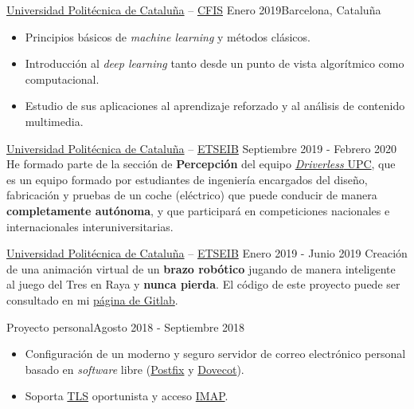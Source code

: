 \documentclass[10pt, a4paper, ragged2e]{../altacv}
\begin{document}
{\href{https://upc.edu}{Universidad Politécnica de Cataluña} --
  \href{https://cfis.upc.edu}{CFIS}}
{Enero 2019}{Barcelona, Cataluña}
\begin{itemize}
  \item Principios básicos de \textit{machine learning} y métodos clásicos.
  \item Introducción al \textit{deep learning} tanto desde un punto de vista
  algorítmico como computacional.
  \item Estudio de sus aplicaciones al aprendizaje reforzado y al análisis de
  contenido multimedia.
\end{itemize}


\clearpage


{\href{https://upc.edu}{Universidad Politécnica de Cataluña} --
\href{https://etseib.upc.edu}{ETSEIB}}
{Septiembre 2019 - Febrero 2020}{}
He formado parte de la sección de \textbf{Percepción} del equipo
\href{https://driverless.upc.edu}{\textit{Driverless} UPC}, que es un equipo
formado por estudiantes de ingeniería encargados del diseño, fabricación y
pruebas de un coche (eléctrico) que puede conducir de manera \textbf{completamente
autónoma}, y que participará en competiciones nacionales e internacionales
interuniversitarias.

\divider

{\href{https://upc.edu}{Universidad Politécnica de Cataluña} --
\href{https://etseib.upc.edu}{ETSEIB}}
{Enero 2019 - Junio 2019}{}
Creación de una animación virtual de un \textbf{brazo robótico} jugando de
manera inteligente al juego del Tres en Raya y \textbf{nunca pierda}. El código
de este proyecto puede ser consultado en mi
\href{https://gitlab.com/DavidAlvarez}{página de Gitlab\footnotemark}.

\divider

{Proyecto personal}{Agosto 2018 - Septiembre 2018}{}
\begin{itemize}
  \item Configuración de un moderno y seguro servidor de correo electrónico
  personal basado en \textit{software} libre
  (\href{http://www.postfix.org/}{Postfix} y
  \href{https://www.dovecot.org/}{Dovecot}).
  \item Soporta \href{https://es.wikipedia.org/wiki/Transport_Layer_Security}{TLS}
  oportunista y acceso
  \href{https://es.wikipedia.org/wiki/Protocolo_de_acceso_a_mensajes_de_Internet}
  {IMAP}.
\end{itemize}
\end{document}
